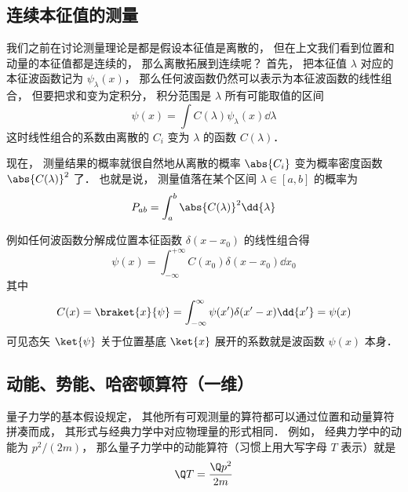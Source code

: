 \subsection{连续本征值的测量}
我们之前在讨论测量理论是都是假设本征值是离散的， 但在上文我们看到位置和动量的本征值都是连续的， 那么离散拓展到连续呢？ 首先， 把本征值 $\lambda$ 对应的本征波函数记为 $\psi_\lambda(x)$， 那么任何波函数仍然可以表示为本征波函数的线性组合， 但要把求和变为定积分， 积分范围是 $\lambda$ 所有可能取值的区间
\begin{equation}
\psi(x) = \int C(\lambda)\psi_\lambda(x) \dd{\lambda}
\end{equation}
这时线性组合的系数由离散的 $C_i$ 变为 $\lambda$ 的函数 $C(\lambda)$．

现在， 测量结果的概率就很自然地从离散的概率 $\abs{C_i}$ 变为概率密度函数 $\abs{C(\lambda)}^2$ 了． 也就是说， 测量值落在某个区间 $\lambda \in [a, b]$ 的概率为
\begin{equation}
P_{ab} = \int_a^b \abs{C(\lambda)}^2 \dd{\lambda}
\end{equation}

例如任何波函数分解成位置本征函数 $\delta(x-x_0)$ 的线性组合得
\begin{equation}
\psi(x) = \int_{-\infty}^{+\infty} C(x_0) \delta(x - x_0) \dd{x_0}
\end{equation}
其中
\begin{equation}
C(x) = \braket{x}{\psi} = \int_{-\infty}^\infty \psi(x')\delta(x'-x)\dd{x'} = \psi(x)
\end{equation}
可见态矢 $\ket{\psi}$ 关于位置基底 $\ket{x}$ 展开的系数就是波函数 $\psi(x)$ 本身．

\subsection{动能、势能、哈密顿算符（一维）}
量子力学的基本假设规定， 其他所有可观测量的算符都可以通过位置和动量算符拼凑而成， 其形式与经典力学中对应物理量的形式相同． 例如， 经典力学中的动能为 $p^2/(2m)$， 那么量子力学中的动能算符（习惯上用大写字母 $T$ 表示）就是
\begin{equation}\label{QM1_eq1}
\Q T = \frac{\Q p^2}{2m}
\end{equation}

